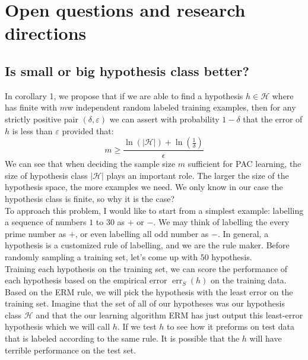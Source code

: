 

\section{Open questions and research directions}
\subsection{Is small or big hypothesis class better?}
In corollary 1, we propose that if we are able to find a hypothesis $h \in \mathcal{H}$ where  has finite with $m$w independent random labeled training examples, then for any strictly positive pair $(\delta, \varepsilon)$ we can assert with probability $1-\delta$ that the error of $h$ is less than $ε$ provided that:
\begin{equation*}
    m \geq \frac{\ln (|\mathcal{H}|)+\ln \left(\frac{1}{\delta}\right)}{\epsilon}
\end{equation*}
We can see that when deciding the sample size $m$ sufficient for PAC learning, the size of hypothesis class $|\mathcal{H}|$ plays an important role. The larger the size of the hypothesis space, the more examples we need. We only know in our case the hypothesis class is finite, so why it is the case?\\

To approach this problem, I would like to start from a simplest example: labelling a sequence of numbers $1$ to $30$ as $+$ or $-$. We may think of labelling the every prime number as $+$, or even labelling all odd number as $-$. In general, a hypothesis is a customized rule of labelling, and we are the rule maker. Before randomly sampling a training set, let's come up with $50$ hypothesis. \\

Training each hypothesis on the training set, we can score the performance of each hypothesis based on the empirical error $\operatorname{err}_{S}(h)$ on the training data. Based on the ERM rule, we will pick the hypothesis with the least error on the training set. Imagine that the set of all of our hypotheses was our hypothesis class $\mathcal{H}$ and that the our learning algorithm ERM has just output this least-error hypothesis which we will call $h$. If we test $h$ to see how it preforms on test data that is labeled according to the same rule. It is possible that the $h$ will have terrible performance on the test set. \\

